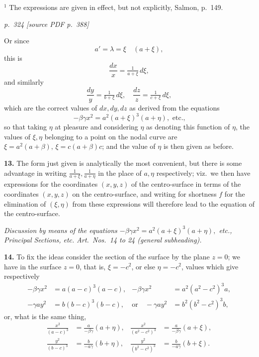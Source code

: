 \documentclass[11pt,a4paper]{article}
\newcommand{\pagemarker}[2]{\par\bigskip\noindent\textit{p.~#1 [source PDF p.~#2]}\par\smallskip}
\begin{document}
\smallskip
\footnotesize
$^1$ The expressions are given in effect, but not explicitly, Salmon, p.~149.

\clearpage

\pagemarker{324}{388}

Or since
\[
a' = \lambda = \xi\quad(a + \xi),
\]
this is
\[
\frac{dx}{x} = \tfrac{1}{a + \xi}\,d\xi,
\]
and similarly
\[
\frac{dy}{y} = \tfrac{1}{b + \xi}\,d\xi,\quad
\frac{dz}{z} = \tfrac{1}{c + \xi}\,d\xi,
\]
which are the correct values of $dx, dy, dz$ as derived from the equations
\[
-\beta\gamma x^2 = a^2(a + \xi)^3(a + \eta), \text{ etc.,}
\]
so that taking $\eta$ at pleasure and considering $\eta$ as denoting this function of $\eta$, the values of $\xi, \eta$ belonging to a point on the nodal curve are $\xi = a^2(a + \beta), \, \xi = c(a + \beta) c$; and the value of $\eta$ is then given as before.

\textbf{13.} The form just given is analytically the most convenient, but there is some advantage in writing $\tfrac{1}{a + \xi}, \tfrac{1}{a + \eta}$ in the place of $a, \eta$ respectively; viz.\ we then have expressions for the coordinates $(x, y, z)$ of the centro-surface in terms of the coordinates $(x, y, z)$ on the centro-surface, and writing for shortness $f$ for the elimination of $(\xi, \eta)$ from these expressions will therefore lead to the equation of the centro-surface.

\textit{Discussion by means of the equations $-\beta\gamma x^2 = a^2(a + \xi)^3(a + \eta),$ etc., Principal Sections, etc. Art.\ Nos.\ 14 to 24 (general subheading).}

\textbf{14.} To fix the ideas consider the section of the surface by the plane $z = 0$; we have in the surface $z = 0$, that is, $\xi = -c^2$, or else $\eta = -c^2$, values which give respectively
\begin{align*}
-\beta\gamma x^2 &= a(a - c)^3(a - c), & -\beta\gamma x^2 &= a^2(a^2 - c^2)^3 a,\\
-\gamma a y^2 &= b(b - c)^3(b - c), & \text{or}\quad -\gamma a y^2 &= b^2(b^2 - c^2)^3 b,
\end{align*}
or, what is the same thing,
\begin{align*}
\tfrac{x^2}{(a - c)^3} &= \tfrac{a}{-\beta\gamma}(a + \eta), & \tfrac{x^2}{(a^2 - c^2)^3} &= \tfrac{a}{-\beta\gamma}(a + \xi),\\
\tfrac{y^2}{(b - c)^3} &= \tfrac{b}{-a\gamma}(b + \eta), & \tfrac{y^2}{(b^2 - c^2)^3} &= \tfrac{b}{-a\gamma}(b + \xi).
\end{align*}
\end{document}
